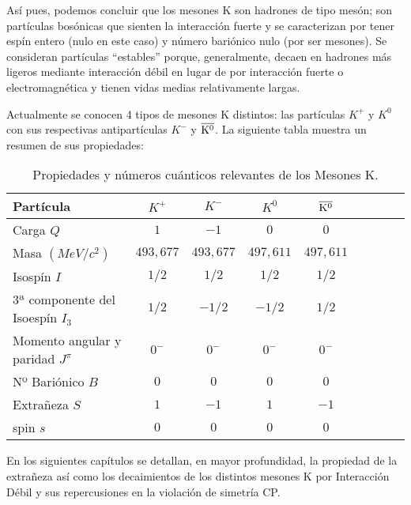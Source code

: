 Así pues, podemos concluir que los mesones K son hadrones de tipo mesón; son partículas bosónicas que sienten la interacción fuerte y se caracterizan por tener espín entero (nulo en este caso) y número bariónico nulo (por ser mesones). Se consideran partículas ``estables'' porque, generalmente, decaen en hadrones más ligeros mediante interacción débil en lugar de por interacción fuerte o electromagnética y tienen vidas medias relativamente largas.

Actualmente se conocen 4 tipos de mesones K distintos: las partículas $K^+$ y $K^0$ con sus respectivas antipartículas $K^-$ y $\overline{\rm K^0}$. La siguiente tabla muestra un resumen de sus propiedades:\\

\begin{table}[h]
	\centering
	\begin{tabular}{l*{7}{c}r}
\hline
Partícula & $K^+$ & $K^-$ & $K^0$ & $\overline{\rm K^0}$ \\ 
\hline
Carga $Q$ & $1$ & $-1$ & $0$ & $0$\\
Masa $(MeV/c^2)$ & $493,677$ & $493,677$ & $497,611$ & $497,611$\\
Isospín $I$ & $1/2$ & $1/2$ & $1/2$ & $1/2$ \\
3ª componente del Isoespín $I_3$ & $1/2$ & $-1/2$ & $-1/2$ & $1/2$ \\
Momento angular y paridad $J^\pi$ & $0^-$ & $0^-$ & $0^-$ & $0^-$ \\
Nº Bariónico $B$ & $0$ & $0$ & $0$ & $0$\\
Extrañeza $S$ & $1$ & $-1$ & $1$ & $-1$\\
spin $s$ & $0$ & $0$ & $0$ & $0$\\ 
\hline
	\end{tabular}
\caption{Propiedades y números cuánticos relevantes de los Mesones K.\protect\footnotemark}
\label{tab:propiedades}
\end{table}


En los siguientes capítulos se detallan, en mayor profundidad, la propiedad de la extrañeza así como los decaimientos de los distintos mesones K por Interacción Débil y sus repercusiones en la violación de simetría CP.




